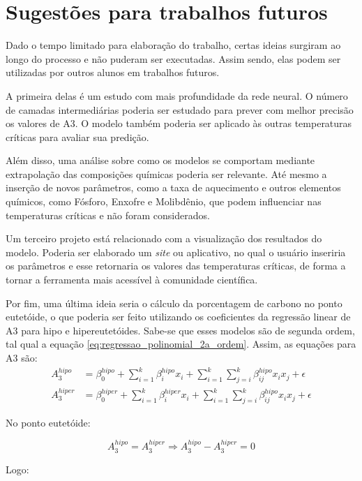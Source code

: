 \documentclass[brazil,tf,epusp]{usp}  %
\begin{document}
\chapter{Sugestões para trabalhos futuros}

Dado o tempo limitado para elaboração do trabalho, certas ideias surgiram ao longo do processo e não puderam ser executadas. Assim sendo, elas podem ser utilizadas por outros alunos em trabalhos futuros.

A primeira delas é um estudo com mais profundidade da rede neural. O número de camadas intermediárias poderia ser estudado para prever com melhor precisão os valores de A3. O modelo também poderia ser aplicado às outras temperaturas críticas para avaliar sua predição.

Além disso, uma análise sobre como os modelos se comportam mediante extrapolação das composições químicas poderia ser relevante. Até mesmo a inserção de novos parâmetros, como a taxa de aquecimento e outros elementos químicos, como Fósforo, Enxofre e Molibdênio, que podem influenciar nas temperaturas críticas e não foram considerados.

Um terceiro projeto está relacionado com a visualização dos resultados do modelo. Poderia ser elaborado um \textit{site} ou aplicativo, no qual o usuário inseriria os parâmetros e esse retornaria os valores das temperaturas críticas, de forma a tornar a ferramenta mais acessível à comunidade científica.

Por fim, uma última ideia seria o cálculo da porcentagem de carbono no ponto eutetóide, o que poderia ser feito utilizando os coeficientes da regressão linear de A3 para hipo e hipereutetóides. Sabe-se que esses modelos são de segunda ordem, tal qual a equação \ref{eq:regressao_polinomial_2a_ordem}. Assim, as equações para A3 são:
\begin{align}
	A_3^{hipo} &= \beta_0^{hipo} + \sum_{i=1}^k \beta_i^{hipo} x_i + \sum_{i=1}^{k} \sum_{j=i}^k \beta_{ij}^{hipo} x_i x_j + \epsilon \\
	A_3^{hiper} &= \beta_0^{hiper} + \sum_{i=1}^k \beta_i^{hiper} x_i + \sum_{i=1}^{k} \sum_{j=i}^k \beta_{ij}^{hipo} x_i x_j + \epsilon
\end{align}

No ponto eutetóide:

\begin{equation}
	A_3^{hipo} = A_3^{hiper} \Rightarrow A_3^{hipo} - A_3^{hiper} = 0
\end{equation}

Logo:
\end{document}
